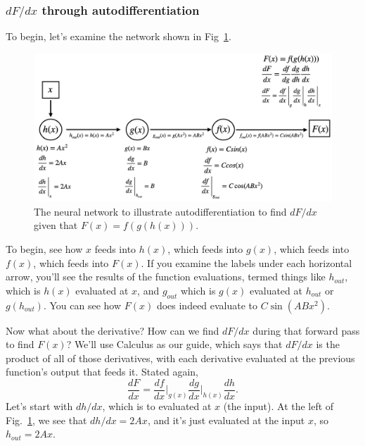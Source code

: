 \documentclass[12pt]{article}
\begin{document}
\subsubsection{$dF/dx$ through autodifferentiation}

To begin, let's examine the network shown in Fig~\ref{fig_autodiff_001}.

\begin{figure}[h]
\begin{center}
\includegraphics[scale=0.25]{Figs/autodiff_001.png}
\caption{The neural network to illustrate autodifferentiation to find $dF/dx$ given that $F(x)=f(g(h(x)))$.}
\label{fig_autodiff_001}
\end{center}
\end{figure}

To begin, see how $x$ feeds into $h(x)$, which feeds into $g(x)$, which feeds into $f(x)$, which feeds into $F(x)$.  If you examine the labels under each horizontal arrow, you'll see the results of the function evaluations, termed things like $h_{out}$, which is $h(x)$ evaluated at $x$, and $g_{out}$ which is $g(x)$ evaluated at $h_{out}$ or $g(h_{out})$.  You can see how $F(x)$ does indeed evaluate to $C\sin(ABx^2)$.

Now what about the derivative? How can we find $dF/dx$ during that forward pass to find $F(x)$?  We'll use Calculus as our guide, which says that $dF/dx$ is the product of all of those derivatives, with each derivative evaluated at the previous function's output that feeds it.  Stated again,
\begin{equation}
\frac{dF}{dx}=\frac{df}{dx}\bigg\rvert_{g(x)}\frac{dg}{dx}\bigg\rvert_{h(x)}\frac{dh}{dx}.
\end{equation}
Let's start with $dh/dx$, which is to evaluated at $x$ (the input). At the left of Fig.~\ref{fig_autodiff_001}, we see that $dh/dx=2Ax$, and it's just evaluated at the input $x$, so $h_{out}=2Ax$.
\end{document}
